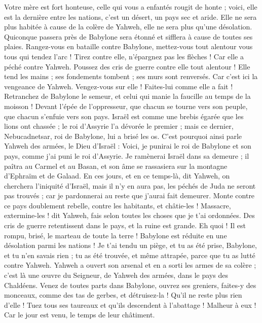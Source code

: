 \begin{multicols}{2}
Votre mère est fort honteuse, celle qui vous a enfantés rougit de honte ; voici, elle est la dernière entre les nations, c'est un désert, un pays sec et aride.
Elle ne sera plus habitée à cause de la colère de Yahweh, elle ne sera plus qu'une désolation. Quiconque passera près de Babylone sera étonné et sifflera à cause de toutes ses plaies.
Rangez-vous en bataille contre Babylone, mettez-vous tout alentour vous tous qui tendez l'arc ! Tirez contre elle, n'épargnez pas les flèches ! Car elle a péché contre Yahweh.
Poussez des cris de guerre contre elle tout alentour ! Elle tend les mains ; ses fondements tombent ; ses murs sont renversés. Car c'est ici la vengeance de Yahweh. Vengez-vous sur elle ! Faites-lui comme elle a fait !
Retranchez de Babylone le semeur, et celui qui manie la faucille au temps de la moisson ! Devant l'épée de l'oppresseur, que chacun se tourne vers son peuple, que chacun s'enfuie vers son pays.
Israël est comme une brebis égarée que les lions ont chassée ; le roi d'Assyrie l'a dévorée le premier ; mais ce dernier, Nebucadnetsar, roi de Babylone, lui a brisé les os.
C'est pourquoi ainsi parle Yahweh des armées, le Dieu d'Israël : Voici, je punirai le roi de Babylone et son pays, comme j'ai puni le roi d'Assyrie.
Je ramènerai Israël dans sa demeure ; il paîtra au Carmel et au Basan, et son âme se rassasiera sur la montagne d'Ephraïm et de Galaad.
En ces jours, et en ce temps-là, dit Yahweh, on cherchera l'iniquité d'Israël, mais il n'y en aura pas, les péchés de Juda ne seront pas trouvés ; car je pardonnerai au reste que j'aurai fait demeurer.
Monte contre ce pays doublement rebelle, contre les habitants, et châtie-les ! Massacre, extermine-les ! dit Yahweh, fais selon toutes les choses que je t'ai ordonnées.
Des cris de guerre retentissent dans le pays, et la ruine est grande.
Eh quoi ! Il est rompu, brisé, le marteau de toute la terre ! Babylone est réduite en une désolation parmi les nations !
Je t'ai tendu un piège, et tu as été prise, Babylone, et tu n'en savais rien ; tu as été trouvée, et même attrapée, parce que tu as lutté contre Yahweh.
Yahweh a ouvert son arsenal et en a sorti les armes de sa colère ; c'est là une œuvre du Seigneur, de Yahweh des armées, dans le pays des Chaldéens.
Venez de toutes parts dans Babylone, ouvrez ses greniers, faites-y des monceaux, comme des tas de gerbes, et détruisez-la ! Qu'il ne reste plus rien d'elle !
Tuez tous ses taureaux et qu'ils descendent à l'abattage ! Malheur à eux ! Car le jour est venu, le temps de leur châtiment.

\end{multicols}
